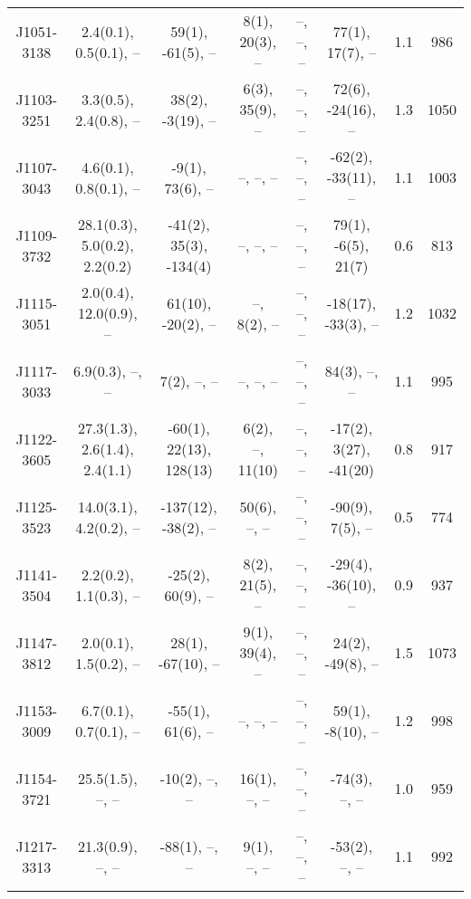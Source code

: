 \documentclass{mnras}
\begin{document}
\begin{table*}
\begin{tabular}{cccccccc}
J1051-3138 & 2.4(0.1), 0.5(0.1), -- & 59(1), -61(5), -- & 8(1), 20(3), -- & --, --, -- & 77(1), 17(7), -- & 1.1 & 986 \\ 

J1103-3251 & 3.3(0.5), 2.4(0.8), -- & 38(2), -3(19), -- & 6(3), 35(9), -- & --, --, -- & 72(6), -24(16), -- & 1.3 & 1050 \\ 

J1107-3043 & 4.6(0.1), 0.8(0.1), -- & -9(1), 73(6), -- & --, --, -- & --, --, -- & -62(2), -33(11), -- & 1.1 & 1003 \\ 

J1109-3732 & 28.1(0.3), 5.0(0.2), 2.2(0.2) & -41(2), 35(3), -134(4) & --, --, -- & --, --, -- & 79(1), -6(5), 21(7) & 0.6 & 813 \\ 

J1115-3051 & 2.0(0.4), 12.0(0.9), -- & 61(10), -20(2), -- & --, 8(2), -- & --, --, -- & -18(17), -33(3), -- & 1.2 & 1032 \\ 

J1117-3033 & 6.9(0.3), --, -- & 7(2), --, -- & --, --, -- & --, --, -- & 84(3), --, -- & 1.1 & 995 \\ 

J1122-3605 & 27.3(1.3), 2.6(1.4), 2.4(1.1) & -60(1), 22(13), 128(13) & 6(2), --, 11(10) & --, --, -- & -17(2), 3(27), -41(20) & 0.8 & 917 \\ 

J1125-3523 & 14.0(3.1), 4.2(0.2), -- & -137(12), -38(2), -- & 50(6), --, -- & --, --, -- & -90(9), 7(5), -- & 0.5 & 774 \\ 

J1141-3504 & 2.2(0.2), 1.1(0.3), -- & -25(2), 60(9), -- & 8(2), 21(5), -- & --, --, -- & -29(4), -36(10), -- & 0.9 & 937 \\ 

J1147-3812 & 2.0(0.1), 1.5(0.2), -- & 28(1), -67(10), -- & 9(1), 39(4), -- & --, --, -- & 24(2), -49(8), -- & 1.5 & 1073 \\ 

J1153-3009 & 6.7(0.1), 0.7(0.1), -- & -55(1), 61(6), -- & --, --, -- & --, --, -- & 59(1), -8(10), -- & 1.2 & 998 \\ 

J1154-3721 & 25.5(1.5), --, -- & -10(2), --, -- & 16(1), --, -- & --, --, -- & -74(3), --, -- & 1.0 & 959 \\

J1217-3313 & 21.3(0.9), --, -- & -88(1), --, -- & 9(1), --, -- & --, --, -- & -53(2), --, -- & 1.1 & 992 \\ 


\end{tabular}
\end{table*}
\end{document}
